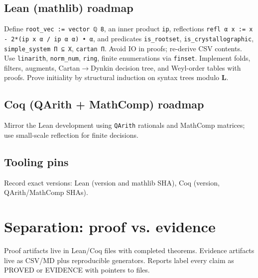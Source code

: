 \documentclass[12pt]{article}
\begin{document}
\subsection*{Lean (mathlib) roadmap}
Define
\verb|root_vec := vector ℚ 8|, an inner product \verb|ip|, reflections \verb|refl α x := x - 2*(ip x α / ip α α) • α|, and predicates
\verb|is_rootset|, \verb|is_crystallographic|, \verb|simple_system Π ⊆ X|, \verb|cartan Π|.
Avoid IO in proofs; re-derive CSV contents. Use \verb|linarith|, \verb|norm_num|, \verb|ring|, finite enumerations via \verb|finset|. Implement folds, filters, augments, Cartan$\to$Dynkin decision tree, and Weyl-order tables with proofs. Prove initiality by structural induction on syntax trees modulo $\mathbf L$.
\subsection*{Coq (QArith + MathComp) roadmap}
Mirror the Lean development using \verb|QArith| rationals and MathComp matrices; use small-scale reflection for finite decisions.
\subsection*{Tooling pins}
Record exact versions: Lean (version and mathlib SHA), Coq (version, QArith/MathComp SHAs).

\section{Separation: proof vs. evidence}
Proof artifacts live in Lean/Coq files with completed theorems. Evidence artifacts live as CSV/MD plus reproducible generators. Reports label every claim as \textsc{PROVED} or \textsc{EVIDENCE} with pointers to files.

\appendix
\end{document}
